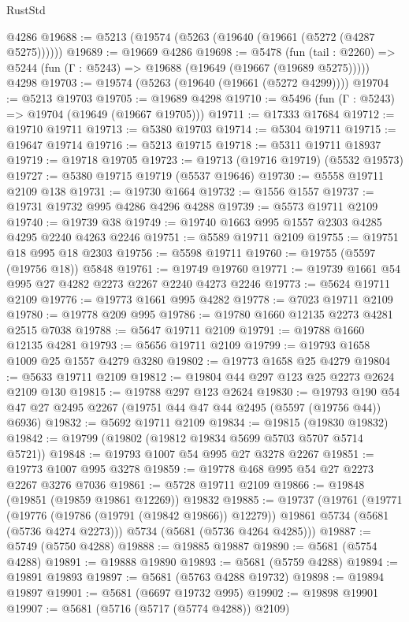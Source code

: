 \begin{lexlean}{RustStd}
\begin{coremodule}
    @4286
@19688 := @5213 (@19574 (@5263 (@19640 (@19661 (@5272 (@4287 @5275))))))
@19689 := @19669 @4286
@19698 := @5478
    (fun (tail : @2260) => @5244 (fun (Γ : @5243) => @19688 (@19649 (@19667 (@19689 @5275)))))
    @4298
@19703 := @19574 (@5263 (@19640 (@19661 (@5272 @4299))))
@19704 := @5213 @19703
@19705 := @19689 @4298
@19710 := @5496 (fun (Γ : @5243) => @19704 (@19649 (@19667 @19705)))
@19711 := @17333 @17684
@19712 := @19710 @19711
@19713 := @5380 @19703
@19714 := @5304 @19711
@19715 := @19647 @19714
@19716 := @5213 @19715
@19718 := @5311 @19711 @18937
@19719 := @19718 @19705
@19723 := @19713 (@19716 @19719) (@5532 @19573)
@19727 := @5380 @19715 @19719 (@5537 @19646)
@19730 := @5558 @19711 @2109 @138
@19731 := @19730 @1664
@19732 := @1556 @1557
@19737 := @19731 @19732 @995 @4286 @4296 @4288
@19739 := @5573 @19711 @2109
@19740 := @19739 @38
@19749 := @19740 @1663 @995 @1557 @2303 @4285 @4295 @2240 @4263 @2246
@19751 := @5589 @19711 @2109
@19755 := @19751 @18 @995 @18 @2303
@19756 := @5598 @19711
@19760 := @19755 (@5597 (@19756 @18)) @5848
@19761 := @19749 @19760
@19771 := @19739 @1661 @54 @995 @27 @4282 @2273 @2267 @2240 @4273 @2246
@19773 := @5624 @19711 @2109
@19776 := @19773 @1661 @995 @4282
@19778 := @7023 @19711 @2109
@19780 := @19778 @209 @995
@19786 := @19780 @1660 @12135 @2273 @4281 @2515 @7038
@19788 := @5647 @19711 @2109
@19791 := @19788 @1660 @12135 @4281
@19793 := @5656 @19711 @2109
@19799 := @19793 @1658 @1009 @25 @1557 @4279 @3280
@19802 := @19773 @1658 @25 @4279
@19804 := @5633 @19711 @2109
@19812 := @19804 @44 @297 @123 @25 @2273 @2624 @2109 @130
@19815 := @19788 @297 @123 @2624
@19830 := @19793 @190 @54 @47 @27 @2495 @2267 (@19751 @44 @47 @44 @2495 (@5597 (@19756 @44)) @6936)
@19832 := @5692 @19711 @2109
@19834 := @19815 (@19830 @19832)
@19842 := @19799 (@19802 (@19812 @19834 @5699 @5703 @5707 @5714 @5721))
@19848 := @19793 @1007 @54 @995 @27 @3278 @2267
@19851 := @19773 @1007 @995 @3278
@19859 := @19778 @468 @995 @54 @27 @2273 @2267 @3276 @7036
@19861 := @5728 @19711 @2109
@19866 := @19848 (@19851 (@19859 @19861 @12269)) @19832
@19885 := @19737
    (@19761
      (@19771
        (@19776 (@19786 (@19791 (@19842 @19866)) @12279))
        @19861
        @5734
        (@5681 (@5736 @4274 @2273)))
      @5734
      (@5681 (@5736 @4264 @4285)))
@19887 := @5749 (@5750 @4288)
@19888 := @19885 @19887
@19890 := @5681 (@5754 @4288)
@19891 := @19888 @19890
@19893 := @5681 (@5759 @4288)
@19894 := @19891 @19893
@19897 := @5681 (@5763 @4288 @19732)
@19898 := @19894 @19897
@19901 := @5681 (@6697 @19732 @995)
@19902 := @19898 @19901
@19907 := @5681 (@5716 (@5717 (@5774 @4288)) @2109)

\end{coremodule}
\end{lexlean}
